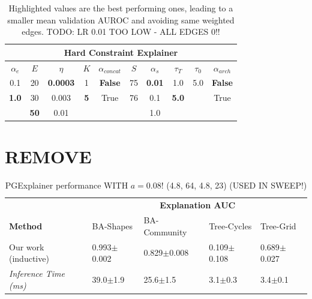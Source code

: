 \begin{table}[h]
    \centering
    \scriptsize
    \begin{tabular}{|c|c|c|c|c|c|c|c|c|c|}
    \hline
    \multicolumn{10}{|c|}{\textbf{Hard Constraint Explainer}} \\ \hline
    $\alpha_e$ & $E$ & $\eta$ & $K$ & $\alpha_{concat}$ & $S$ & $\alpha_s$ & $\tau_T$ & $\tau_0$ & $\alpha_{arch}$ \\ \hline
    0.1 & 20 & \textbf{0.0003} & 1  & \textbf{False} & 75 & \textbf{0.01} & 1.0 & 5.0 & \textbf{False} \\
    \textbf{1.0} & 30 & 0.003  & \textbf{5}  & True  & 76 & 0.1 & \textbf{5.0} &  & True  \\
        &  \textbf{50} & 0.01   &  &       &     &   1.0   &      &      &       \\ \hline
    \end{tabular}
    \caption[NeuroSAT hard constraint Sweep]{Highlighted values are the best performing ones, leading to a smaller mean validation AUROC and avoiding same weighted edges. TODO: LR 0.01 TOO LOW - ALL EDGES 0!!}
\end{table}


\section{REMOVE}
\begin{table}[ht]
  \centering
  \scriptsize
  \begin{tabularx}{\textwidth}{l*{4}{X}}   %
  \toprule
  \textbf{} & \multicolumn{4}{c}{\textbf{Explanation AUC}} \\
  \cmidrule{2-5}
  \textbf{Method} & BA-Shapes & BA-Community & Tree-Cycles & Tree-Grid \\
  \midrule
  Our work (inductive) & 0.993$\pm$0.002 & 0.829$\pm$0.008 & 0.109$\pm$0.108 & 0.689$\pm$0.027 \\
  \addlinespace
  \midrule
  \midrule
  \textit{Inference Time (ms)} & 39.0$\pm$1.9 & 25.6$\pm$1.5 & 3.1$\pm$0.3 & 3.4$\pm$0.1 \\
  \bottomrule
  \end{tabularx}
  \caption[REMOVE! PGExplainer with $a=0.08$!]{PGExplainer performance WITH $a=0.08$! (4.8, 64, 4.8, 23) (USED IN SWEEP!)}
  \label{tab:pgexplainer_auc}
\end{table}